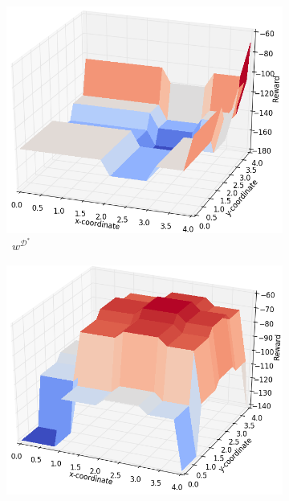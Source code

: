 \documentclass{aamas2016}
\begin{document}
\begin{figure}[t]
  \centering
  \begin{subfigure}[b]{0.52\columnwidth}
    \includegraphics[clip=true,width=\textwidth]{images/RF_D.png}

    
    \caption{\ $w^{\mathcal{D}^*}$}
    \label{fig:rf_plot_good}
  \end{subfigure}
  \hfill
  \begin{subfigure}[b]{0.51\columnwidth}
    \includegraphics[clip=true,width=\textwidth]{images/RF_F.png}


\end{subfigure}
\end{figure}
\end{document}
